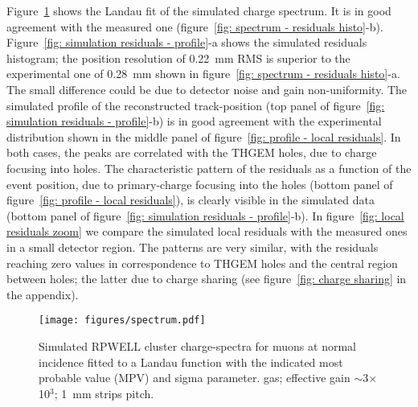 Figure~\ref{fig: simulated spectrum} shows the Landau fit of the simulated charge spectrum. It is in good agreement with the measured one (figure~\ref{fig: spectrum - residuals histo}-b). Figure~\ref{fig: simulation residuals - profile}-a shows the simulated residuals histogram; the position resolution of 0.22~mm RMS is superior to the experimental one of 0.28~mm shown in figure~\ref{fig: spectrum - residuals histo}-a. The small difference could be due to detector noise and gain non-uniformity.
The simulated profile of the reconstructed track-position (top panel of figure~\ref{fig: simulation residuals - profile}-b) is in good agreement with the experimental distribution shown in the middle panel of figure~\ref{fig: profile - local residuals}. In both cases, the peaks are correlated with the THGEM holes, due to charge focusing into holes. The characteristic pattern of the residuals as a function of the event position, due to primary-charge focusing into the holes (bottom panel of figure~\ref{fig: profile - local residuals}), is clearly visible in the simulated data (bottom panel of figure~\ref{fig: simulation residuals - profile}-b). In figure~\ref{fig: local residuals zoom} we compare the simulated local residuals with the measured ones in a small detector region. The patterns are very similar, with the residuals reaching zero values in correspondence to THGEM holes and the central region between holes; the latter due to charge sharing (see figure~\ref{fig: charge sharing} in the appendix).


\begin{figure}[h]
\centering
\texttt{[image: figures/spectrum.pdf]}
\caption{Simulated RPWELL cluster charge-spectra for muons at normal incidence fitted to a Landau function with the indicated most probable value (MPV) and sigma parameter. \nech gas; effective gain $\sim$3$\times$10$^3$; 1~mm strips pitch.}\label{fig: simulated spectrum}
\end{figure}

